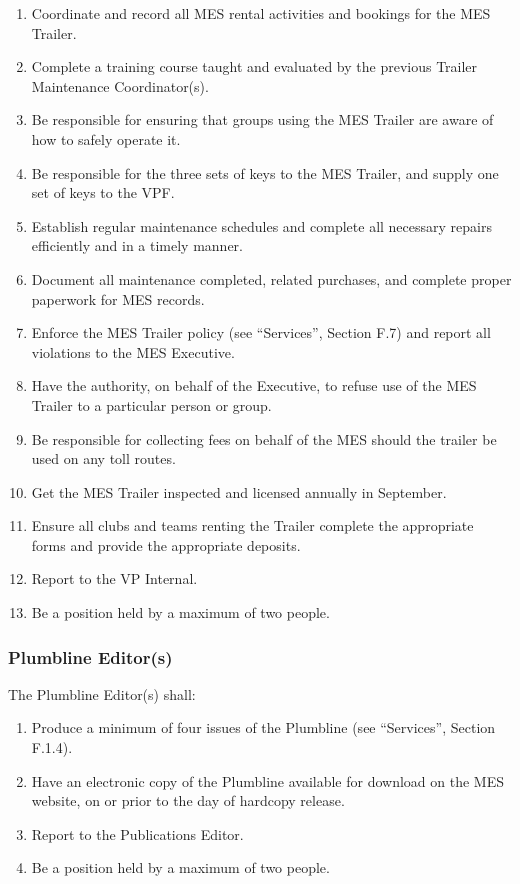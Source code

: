\begin{enumerate}
 \item
  Coordinate and record all MES rental activities and bookings for the
  MES Trailer.
 \item
  Complete a training course taught and evaluated by the previous
  Trailer Maintenance Coordinator(s).
 \item
  Be responsible for ensuring that groups using the MES Trailer are
  aware of how to safely operate it.
 \item
  Be responsible for the three sets of keys to the MES Trailer, and
  supply one set of keys to the VPF.
 \item
  Establish regular maintenance schedules and complete all necessary
  repairs efficiently and in a timely manner.
 \item
  Document all maintenance completed, related purchases, and complete
  proper paperwork for MES records.
 \item
  Enforce the MES Trailer policy (see ``Services'', Section F.7) and
  report all violations to the MES Executive.
 \item
  Have the authority, on behalf of the Executive, to refuse use of the
  MES Trailer to a particular person or group.
 \item
  Be responsible for collecting fees on behalf of the MES should the
  trailer be used on any toll routes.
 \item
  Get the MES Trailer inspected and licensed annually in September.
 \item
  Ensure all clubs and teams renting the Trailer complete the
  appropriate forms and provide the appropriate deposits.
 \item
  Report to the VP Internal.
 \item
  Be a position held by a maximum of two people.

\end{enumerate}

\hypertarget{plumbline-editors}{%
 \subsubsection{Plumbline Editor(s)}
 \label{plumbline-editors}}
The Plumbline Editor(s) shall:

\begin{enumerate}
 \item
  Produce a minimum of four issues of the Plumbline (see ``Services'',
  Section F.1.4).
 \item
  Have an electronic copy of the Plumbline available for download on the
  MES website, on or prior to the day of hardcopy release.
 \item
  Report to the Publications Editor.
 \item
  Be a position held by a maximum of two people.


\end{enumerate}

